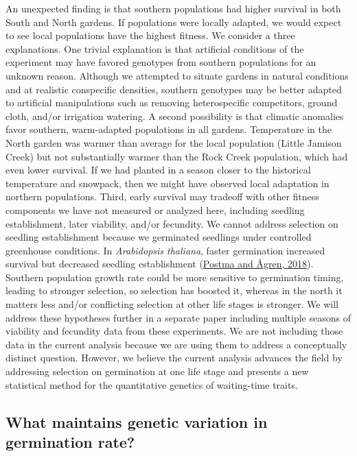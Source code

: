 \documentclass[
  12pt,
]{article}
\begin{document}
An unexpected finding is that southern populations had higher survival in both South and North gardens. If populations were locally adapted, we would expect to see local populations have the highest fitness. We consider a three explanations. One trivial explanation is that artificial conditions of the experiment may have favored genotypes from southern populations for an unknown reason. Although we attempted to situate gardens in natural conditions and at realistic conspecific densities, southern genotypes may be better adapted to artificial manipulations such as removing heterospecific competitors, ground cloth, and/or irrigation watering. A second possibility is that climatic anomalies favor southern, warm-adapted populations in all gardens. Temperature in the North garden was warmer than average for the local population (Little Jamison Creek) but not substantially warmer than the Rock Creek population, which had even lower survival. If we had planted in a season closer to the historical temperature and snowpack, then we might have observed local adaptation in northern populations. Third, early survival may tradeoff with other fitness components we have not measured or analyzed here, including seedling establishment, later viability, and/or fecundity. We cannot address selection on seedling establishment because we germinated seedlings under controlled greenhouse conditions. In \emph{Arabidopsis thaliana}, faster germination increased survival but decreased seedling establishment (\protect\hyperlink{ref-postma_among-year_2018}{Postma and Ågren, 2018}). Southern population growth rate could be more sensitive to germination timing, leading to stronger selection, so selection has boosted it, whereas in the north it matters less and/or conflicting selection at other life stages is stronger. We will address these hypotheses further in a separate paper including multiple seasons of viability and fecundity data from these experiments. We are not including those data in the current analysis because we are using them to address a conceptually distinct question. However, we believe the current analysis advances the field by addressing selection on germination at one life stage and presents a new statistical method for the quantitative genetics of waiting-time traits.

\hypertarget{what-maintains-genetic-variation-in-germination-rate}{%
\subsection{What maintains genetic variation in germination rate?}\label{what-maintains-genetic-variation-in-germination-rate}}
\end{document}
